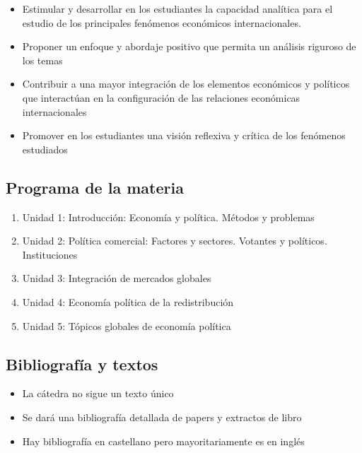\documentclass[
]{article}
\providecommand{\tightlist}{%
  \setlength{\itemsep}{0pt}\setlength{\parskip}{0pt}}
\begin{document}
\begin{itemize}
\tightlist
\item
  Estimular y desarrollar en los estudiantes la capacidad analítica para
  el estudio de los principales fenómenos económicos internacionales.
\item
  Proponer un enfoque y abordaje positivo que permita un análisis
  riguroso de los temas
\item
  Contribuir a una mayor integración de los elementos económicos y
  políticos que interactúan en la configuración de las relaciones
  económicas internacionales
\item
  Promover en los estudiantes una visión reflexiva y crítica de los
  fenómenos estudiados
\end{itemize}

\hypertarget{programa-de-la-materia}{%
\subsection{Programa de la materia}\label{programa-de-la-materia}}

\begin{enumerate}
\def\labelenumi{\arabic{enumi}.}
\tightlist
\item
  Unidad 1: Introducción: Economía y política. Métodos y problemas
\item
  Unidad 2: Política comercial: Factores y sectores. Votantes y
  políticos. Instituciones
\item
  Unidad 3: Integración de mercados globales
\item
  Unidad 4: Economía política de la redistribución
\item
  Unidad 5: Tópicos globales de economía política
\end{enumerate}

\hypertarget{bibliografuxeda-y-textos}{%
\subsection{Bibliografía y textos}\label{bibliografuxeda-y-textos}}

\begin{itemize}
\tightlist
\item
  La cátedra no sigue un texto único
\item
  Se dará una bibliografía detallada de papers y extractos de libro
\item
  Hay bibliografía en castellano pero mayoritariamente es en inglés
\end{itemize}
\end{document}
